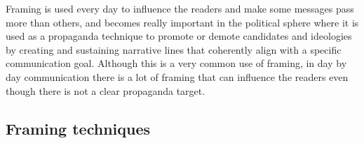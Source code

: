 Framing is used every day to influence the readers and make some messages pass more than others, and becomes really important in the political sphere where it is used as a propaganda technique to promote or demote candidates and ideologies by creating and sustaining narrative lines that coherently align with a specific communication goal.
Although this is a very common use of framing, in day by day communication there is a lot of framing that can influence the readers even though there is not a clear propaganda target.



\subsection{Framing techniques}
\label{ssec:lit_framing_theory}



